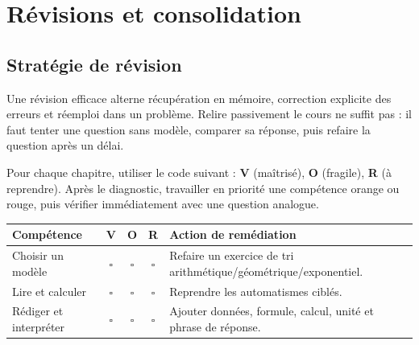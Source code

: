 
\chapter{Révisions et consolidation}
\section{Stratégie de révision}
\begin{retenir}
Une révision efficace alterne récupération en mémoire, correction explicite des erreurs et réemploi dans un problème. Relire passivement le cours ne suffit pas : il faut tenter une question sans modèle, comparer sa réponse, puis refaire la question après un délai.
\end{retenir}

Pour chaque chapitre, utiliser le code suivant : \textbf{V} (maîtrisé), \textbf{O} (fragile), \textbf{R} (à reprendre). Après le diagnostic, travailler en priorité une compétence orange ou rouge, puis vérifier immédiatement avec une question analogue.

\begin{center}
\begin{tabularx}{.9\textwidth}{lcccX}
\toprule
Compétence & V & O & R & Action de remédiation \\
\midrule
Choisir un modèle & $\square$ & $\square$ & $\square$ & Refaire un exercice de tri arithmétique/géométrique/exponentiel.\\
Lire et calculer & $\square$ & $\square$ & $\square$ & Reprendre les automatismes ciblés.\\
Rédiger et interpréter & $\square$ & $\square$ & $\square$ & Ajouter données, formule, calcul, unité et phrase de réponse.\\
\bottomrule
\end{tabularx}
\end{center}

